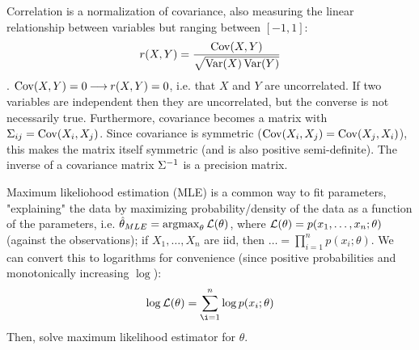 \documentclass{article}
\begin{document}
\begin{solution}
    Correlation is a normalization of covariance, also measuring the linear relationship between variables but ranging between $[-1, 1]$:
    $$r(X,Y) = \frac{\operatorname{Cov}(X,Y)}{\sqrt{\operatorname{Var}(X)\operatorname{Var}(Y)}}$$. $\operatorname{Cov}(X,Y) = 0 \mathbin{\longrightarrow} r(X,Y) = 0$, i.e. that $X$ and $Y$ are uncorrelated. If two variables are independent then they are uncorrelated, but the converse is not necessarily true. Furthermore, covariance becomes a matrix \covarmat with $\Sigma_{ij} = \operatorname{Cov}(X_i, X_j)$. Since covariance is symmetric ($\operatorname{Cov}(X_i, X_j) = \operatorname{Cov}(X_j, X_i)$), this makes the matrix itself symmetric (and is also positive semi-definite). The inverse of a covariance matrix ${\Sigma}^{-1}$ is a precision matrix.

    Maximum likeliohood estimation (MLE) is a common way to fit parameters, "explaining" the data by maximizing probability/density of the data as a function of the parameters, i.e. $\hat{\theta}_{MLE} = \operatorname{arg max}_\theta \mathcal{L}(\theta)$, where $\mathcal{L}(\theta) = p(x_1, \ldots, x_n; \theta)$ (against the observations); if $X_1, \ldots, X_n$ are iid, then $\ldots = \prod_{i=1}^n p(x_i; \theta)$. We can convert this to logarithms for convenience (since positive probabilities and monotonically increasing $\log$):
    $$\log \likelihood(\theta) = \sum_{\i=1}^n \log p(x_i; \theta)$$
    Then, solve maximum likelihood estimator for $\theta$.

\end{solution}
\end{document}
